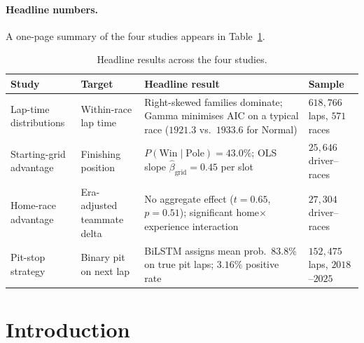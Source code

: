 \documentclass[11pt,a4paper]{article}
\theoremstyle{remark}
\begin{document}
\paragraph{Headline numbers.}
A one-page summary of the four studies appears in
Table~\ref{tab:summary}.
\begin{table}[H]
  \centering
  \small
  \caption{Headline results across the four studies.}
  \label{tab:summary}
  \begin{tabular}{
      >{\raggedright\arraybackslash}p{}
      >{\raggedright\arraybackslash}p{}
      >{\raggedright\arraybackslash}p{}
      >{\raggedright\arraybackslash}p{}}
    \toprule
    Study & Target & Headline result & Sample \\
    \midrule
    Lap-time distributions
      & Within-race lap time
      & Right-skewed families dominate; Gamma minimises AIC on a typical race ($1921.3$ vs.\ $1933.6$ for Normal)
      & $618{,}766$ laps, $571$ races \\
    \addlinespace[2pt]
    Starting-grid advantage
      & Finishing position
      & $P(\text{Win}\mid\text{Pole})=43.0\%$; OLS slope $\hat\beta_\text{grid}=0.45$ per slot
      & $25{,}646$ driver--races \\
    \addlinespace[2pt]
    Home-race advantage
      & Era-adjusted teammate delta
      & No aggregate effect ($t=0.65$, $p=0.51$); significant home$\times$experience interaction
      & $27{,}304$ driver--races \\
    \addlinespace[2pt]
    Pit-stop strategy
      & Binary pit on next lap
      & BiLSTM assigns mean prob.\ $83.8\%$ on true pit laps; $3.16\%$ positive rate
      & $152{,}475$ laps, $2018$--$2025$ \\
    \bottomrule
  \end{tabular}
\end{table}

\section{Introduction}
\end{document}
